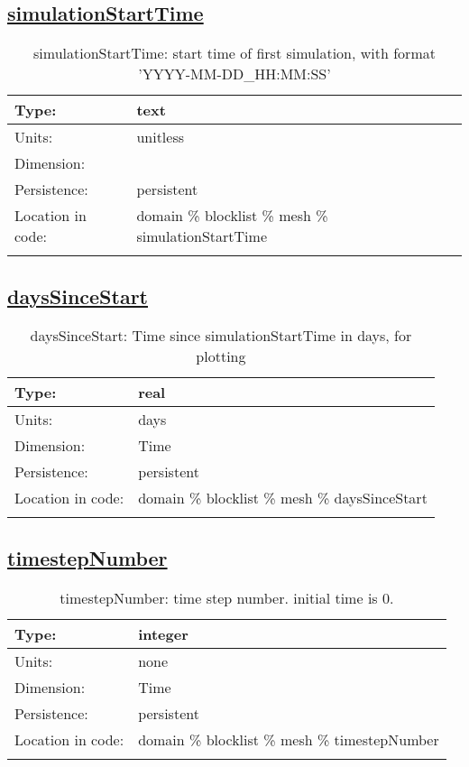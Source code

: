 \subsection[simulationStartTime]{\hyperref[sec:var_tab_mesh]{simulationStartTime}}
\label{subsec:var_sec_mesh_simulationStartTime}
\begin{center}
\begin{longtable}{| p{2.0in} | p{4.0in} |}
        \hline 
        Type: & text \\
        \hline 
        Units: & \si{unitless} \\
        \hline 
        Dimension: &  \\
        \hline 
        Persistence: & persistent \\
        \hline 
         Location in code: & domain \% blocklist \% mesh \% simulationStartTime \\
         \hline 
    \caption{simulationStartTime: start time of first simulation, with format 'YYYY-MM-DD\_HH:MM:SS'}
\end{longtable}
\end{center}
\subsection[daysSinceStart]{\hyperref[sec:var_tab_mesh]{daysSinceStart}}
\label{subsec:var_sec_mesh_daysSinceStart}
\begin{center}
\begin{longtable}{| p{2.0in} | p{4.0in} |}
        \hline 
        Type: & real \\
        \hline 
        Units: & \si{days} \\
        \hline 
        Dimension: & Time \\
        \hline 
        Persistence: & persistent \\
        \hline 
         Location in code: & domain \% blocklist \% mesh \% daysSinceStart \\
         \hline 
    \caption{daysSinceStart: Time since simulationStartTime in days, for plotting}
\end{longtable}
\end{center}
\subsection[timestepNumber]{\hyperref[sec:var_tab_mesh]{timestepNumber}}
\label{subsec:var_sec_mesh_timestepNumber}
\begin{center}
\begin{longtable}{| p{2.0in} | p{4.0in} |}
        \hline 
        Type: & integer \\
        \hline 
        Units: & \si{none} \\
        \hline 
        Dimension: & Time \\
        \hline 
        Persistence: & persistent \\
        \hline 
         Location in code: & domain \% blocklist \% mesh \% timestepNumber \\
         \hline 
    \caption{timestepNumber: time step number.  initial time is 0.}
\end{longtable}
\end{center}
